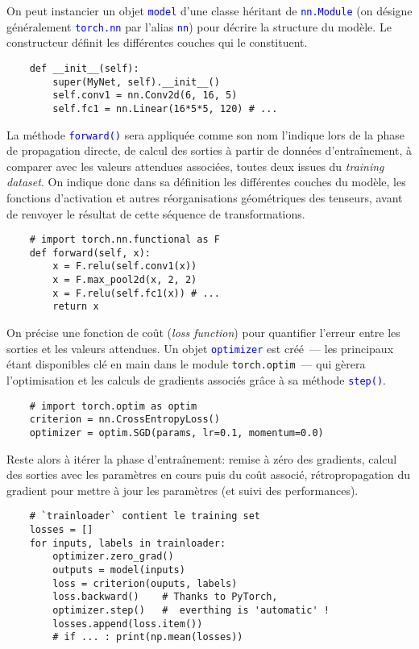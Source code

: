 \documentclass[a4paper,11pt]{article} %
\newcommand{\ttt}[1]{\texttt{#1}}
\newcommand{\code}[1]{\textcolor{blue}{\texttt{#1}}}
\begin{document}
On peut instancier un objet \code{model} d'une classe héritant de \code{nn.Module} (on désigne généralement \code{torch.nn} par l'alias \code{nn}) pour décrire la structure du modèle. Le constructeur définit les différentes couches qui le constituent.%
    \begin{verbatim}
    def __init__(self):
        super(MyNet, self).__init__()
        self.conv1 = nn.Conv2d(6, 16, 5)
        self.fc1 = nn.Linear(16*5*5, 120) # ...
    \end{verbatim}
La méthode \code{forward()} sera appliquée comme son nom l'indique lors de la phase de propagation directe, de calcul des sorties à partir de données d'entraînement, à comparer avec les valeurs attendues associées, toutes deux issues du \emph{training dataset}. On indique donc dans sa définition les différentes couches du modèle, les fonctions d'activation et autres réorganisations \og géométriques\fg{} des tenseurs, avant de renvoyer le résultat de cette séquence de transformations.
    \begin{verbatim}
    # import torch.nn.functional as F
    def forward(self, x):
        x = F.relu(self.conv1(x))
        x = F.max_pool2d(x, 2, 2)
        x = F.relu(self.fc1(x)) # ...
        return x
    \end{verbatim}

On précise une fonction de coût (\emph{loss function}) pour quantifier l'erreur entre les sorties et les valeurs attendues. Un objet \code{optimizer} est créé~--- les principaux étant disponibles \og clé en main\fg{} dans le module \ttt{torch.optim}~--- qui gèrera l'optimisation et les calculs de gradients associés grâce à sa méthode \code{step()}.
    \begin{verbatim}
    # import torch.optim as optim
    criterion = nn.CrossEntropyLoss()
    optimizer = optim.SGD(params, lr=0.1, momentum=0.0)
    \end{verbatim}

Reste alors à itérer la phase d'entraînement: remise à zéro des gradients, calcul des sorties avec les paramètres en cours puis du coût associé, rétropropagation du gradient pour mettre à jour les paramètres (et suivi des performances).
    \begin{verbatim}
    # `trainloader` contient le training set
    losses = []
    for inputs, labels in trainloader:
        optimizer.zero_grad()
        outputs = model(inputs)
        loss = criterion(ouputs, labels)
        loss.backward()    # Thanks to PyTorch,
        optimizer.step()   #  everthing is 'automatic' !
        losses.append(loss.item())
        # if ... : print(np.mean(losses))
    \end{verbatim}
\end{document}
